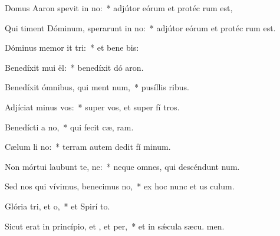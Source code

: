 \item Domus Aaron spevit in no:~* adjútor eórum et protéc rum est,
\item Qui timent Dóminum, sperarunt in no:~* adjútor eórum et protéc rum est.
\item Dóminus memor it tri:~* et bene bis:
\item Benedíxit mui ël:~* benedíxit dó aron.
\item Benedíxit ómnibus, qui ment num,~* pusíllis  ribus.
\item Adjíciat minus  vos:~* super vos, et super fí tros.
\item Benedícti  a no,~* qui fecit cæ,  ram.
\item Cælum li no:~* terram autem dedit fí minum.
\item Non mórtui laubunt te, ne:~* neque omnes, qui descéndunt  num.
\item Sed nos qui vívimus, benecimus no,~* ex hoc nunc et us  culum.
\item Glória tri, et o,~* et Spirí to.
\item Sicut erat in princípio, et , et per,~* et in sǽcula sæcu. men.
